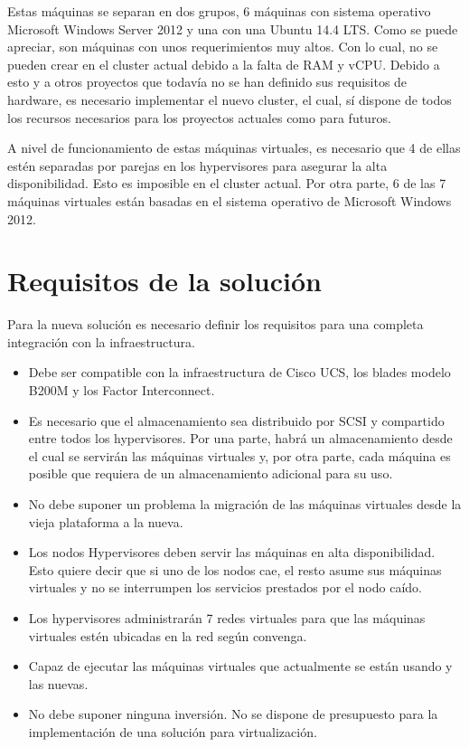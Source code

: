 \documentclass[12pt,a4paper,titlepage,twoside]{report}
\begin{document}
Estas máquinas se separan en dos grupos, 6 máquinas con sistema operativo Microsoft Windows Server 2012 y una con una Ubuntu 14.4 LTS.
Como se puede apreciar, son máquinas con unos requerimientos muy altos. Con lo cual, no se pueden crear en el cluster actual debido a la falta de RAM y vCPU. Debido a esto y a otros proyectos que todavía no se han definido sus requisitos de hardware, es necesario implementar el nuevo cluster, el cual, sí dispone de todos los recursos necesarios para los proyectos actuales como para futuros.
\par
A nivel de funcionamiento de estas máquinas virtuales, es necesario que 4 de ellas estén separadas por parejas en los hypervisores para asegurar la alta disponibilidad. Esto es imposible en el cluster actual. Por otra parte, 6 de las 7 máquinas virtuales están basadas en el sistema operativo de Microsoft Windows 2012.
\section{Requisitos de la solución}

Para la nueva solución es necesario definir los requisitos para una completa integración con la infraestructura.
\begin{itemize}
    \item Debe ser compatible con la infraestructura de Cisco UCS, los blades modelo B200M y los Factor Interconnect.
    \item Es necesario que el almacenamiento sea distribuido por SCSI y compartido entre todos los hypervisores. Por una parte, habrá un almacenamiento desde el cual se servirán las máquinas virtuales y, por otra parte, cada máquina es posible que requiera de un almacenamiento adicional para su uso.
    \item No debe suponer un problema la migración de las máquinas virtuales desde la vieja plataforma a la nueva.
    \item Los nodos Hypervisores deben servir las máquinas en alta disponibilidad. Esto quiere decir que si uno de los nodos cae, el resto asume sus máquinas virtuales y no se interrumpen los servicios prestados por el nodo caído.
    \item Los hypervisores administrarán 7 redes virtuales para que las máquinas virtuales estén ubicadas en la red según convenga.
    \item Capaz de ejecutar las máquinas virtuales que actualmente se están usando y las nuevas.
    \item No debe suponer ninguna inversión. No se dispone de presupuesto para la implementación de una solución para virtualización.
\end{itemize}
\end{document}

